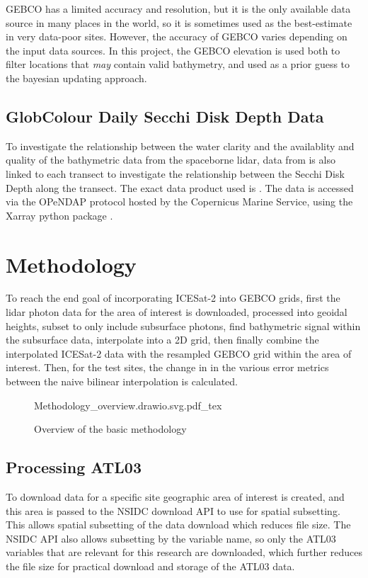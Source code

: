 GEBCO has a limited accuracy and resolution, but it is the only available data source in many places in the world, so it is sometimes used as the best-estimate in very data-poor sites. However, the accuracy of GEBCO varies depending on the input data sources. In this project, the GEBCO elevation is used both to filter locations that \emph{may} contain valid bathymetry, and used as a prior guess to the bayesian updating approach. 

\subsection{GlobColour Daily Secchi Disk Depth Data}

To investigate the relationship between the water clarity and the availablity and quality of the bathymetric data from the spaceborne lidar, data from \citeauthor{Garnesson2019} is also linked to each transect to investigate the relationship between the Secchi Disk Depth  along the transect. The exact data product used is \cite{Garnesson2019}. The data is accessed via the OPeNDAP protocol hosted by the Copernicus Marine Service, using the Xarray python package \parencite{hoyer_stephan_2022_6323468,hoyer2017xarray}.



\section{Methodology}


To reach the end goal of incorporating ICESat-2 into GEBCO grids, first the lidar photon data for the area of interest is downloaded, processed into geoidal heights, subset to only include subsurface photons, find bathymetric signal within the subsurface data, interpolate into a 2D grid, then finally combine the interpolated ICESat-2 data with the resampled GEBCO grid within the area of interest. Then, for the test sites, the change in in the various error metrics between the naive bilinear interpolation is calculated. 


\begin{figure}[h]
    \centering
    {Methodology_overview.drawio.svg.pdf_tex}
    \caption{Overview of the basic methodology}
    \label{fig:methodology-overview}
\end{figure}

\subsection{Processing ATL03}
To download data for a specific site geographic area of interest is created, and this area is passed to the NSIDC download API to use for spatial subsetting. This allows spatial subsetting of the data download which reduces file size. The NSIDC API also allows subsetting by the variable name, so only the ATL03 variables that are relevant for this research are downloaded, which further reduces the file size for practical download and storage of the ATL03 data. 

